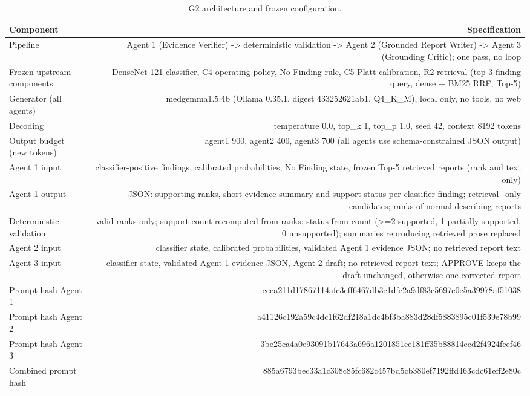 \begin{table}[t]
\centering
\scriptsize
\begin{tabular}{lr}
\hline
Component & Specification \\
\hline
Pipeline & Agent 1 (Evidence Verifier) -> deterministic validation -> Agent 2 (Grounded Report Writer) -> Agent 3 (Grounding Critic); one pass, no loop \\
Frozen upstream components & DenseNet-121 classifier, C4 operating policy, No Finding rule, C5 Platt calibration, R2 retrieval (top-3 finding query, dense + BM25 RRF, Top-5) \\
Generator (all agents) & medgemma1.5:4b (Ollama 0.35.1, digest 433252621ab1, Q4\_K\_M), local only, no tools, no web \\
Decoding & temperature 0.0, top\_k 1, top\_p 1.0, seed 42, context 8192 tokens \\
Output budget (new tokens) & agent1 900, agent2 400, agent3 700 (all agents use schema-constrained JSON output) \\
Agent 1 input & classifier-positive findings, calibrated probabilities, No Finding state, frozen Top-5 retrieved reports (rank and text only) \\
Agent 1 output & JSON: supporting ranks, short evidence summary and support status per classifier finding; retrieval\_only candidates; ranks of normal-describing reports \\
Deterministic validation & valid ranks only; support count recomputed from ranks; status from count (>=2 supported, 1 partially supported, 0 unsupported); summaries reproducing retrieved prose replaced \\
Agent 2 input & classifier state, calibrated probabilities, validated Agent 1 evidence JSON; no retrieved report text \\
Agent 3 input & classifier state, validated Agent 1 evidence JSON, Agent 2 draft; no retrieved report text; APPROVE keeps the draft unchanged, otherwise one corrected report \\
Prompt hash Agent 1 & ccca211d17867114afc3eff6467db3e1dfe2a9df83c5697c0e5a39978af51038 \\
Prompt hash Agent 2 & a41126c192a59c4dc1f62df218a1dc4bf3ba883d28df5883895c01f539e78b99 \\
Prompt hash Agent 3 & 3be25ca4a0e93091b17643a696a1201851ee181ff35b88814ecd2f4924fcef46 \\
Combined prompt hash & 885a6793bec33a1c308c85fc682c457bd5cb380ef7192ffd463cdc61eff2e80c \\
\hline
\end{tabular}
\caption{G2 architecture and frozen configuration.}
\label{tab:table1_g2_architecture_configuration}
\end{table}

